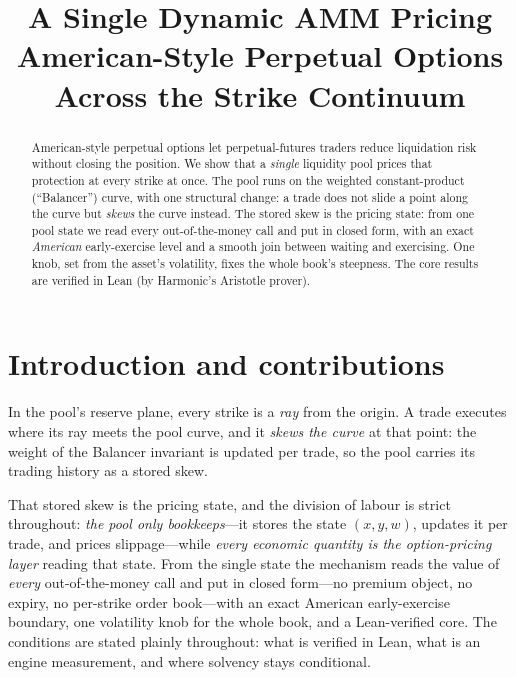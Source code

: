 \documentclass[runningheads]{llncs}
\title{A Single Dynamic AMM Pricing American-Style Perpetual Options
Across the Strike Continuum}
\author{}
\institute{}
\begin{document}
\maketitle

\begin{abstract}
American-style perpetual options let perpetual-futures traders reduce
liquidation risk without closing the position. We show that a \emph{single}
liquidity pool prices that protection at every strike at once. The pool runs on
the weighted constant-product (``Balancer'') curve, with one structural change:
a trade does not slide a point along the curve but \emph{skews} the curve
instead. The stored skew is the pricing state: from one pool state we read
every out-of-the-money call and put in closed form, with an exact
\emph{American} early-exercise level and a smooth join between waiting and
exercising. One knob, set from the asset's volatility, fixes the whole
book's steepness. The core results are verified in Lean (by Harmonic's
Aristotle prover).

\end{abstract}

\section{Introduction and contributions}\label{sec:idea}

In the pool's reserve plane, every strike is a \emph{ray} from the origin. A
trade executes where its ray meets the pool curve, and it \emph{skews the
curve} at that point: the weight of the Balancer invariant is updated per
trade, so the pool carries its trading history as a stored skew.

That stored skew is the pricing state, and the division of labour is strict
throughout: \emph{the pool only bookkeeps}---it stores the state $(x,y,w)$,
updates it per trade, and prices slippage---while \emph{every economic
quantity is the option-pricing layer} reading that state. From the single
state the mechanism reads the value of \emph{every} out-of-the-money call and
put in closed form---no premium object, no expiry, no per-strike order
book---with an exact American early-exercise boundary, one volatility knob for
the whole book, and a Lean-verified core. The conditions are stated plainly
throughout: what is verified in Lean, what is an engine measurement, and where
solvency stays conditional.
\end{document}
